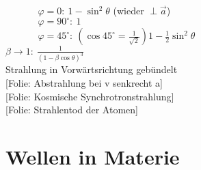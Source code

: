 \documentclass[titlepage,12pt,a4paper,ngerman]{report}
\newcommand{\folie}[1]{\color{gray}[Folie: #1]\color{black}}
\begin{document}
\begin{enumerate}[i)]
\begin{itemize}
		$\phantom{\qquad \quad \ \, }  \varphi = 0 :  \ 1 - \sin ^2 \theta  $ (wieder $ \perp \vec{a} $)\\
		$\phantom{\qquad \quad \ \, } \varphi = 90^\circ : \ 1 $\\
		$\phantom{\qquad \quad \ \, } \varphi = 45^\circ : \ (\cos 45^\circ = \frac{1}{\sqrt{2}} )  1 - \frac{1}{2} \sin^2 \theta $\\
		$ \beta \rightarrow 1 : \ \frac{1}{(1 - \beta \cos \theta)^3} $\\
		\phantom{\qquad \quad \ \, } Strahlung in Vorwärtsrichtung gebündelt\\
		\phantom{\qquad \quad \ \, } \folie{Abstrahlung bei v senkrecht a} \\ \phantom{\qquad \quad \ \, } \folie{Kosmische Synchrotronstrahlung} \\
		\phantom{\qquad \quad \ \, } \folie{Strahlentod der Atomen}
	\end{itemize}
\end{enumerate}

\section{Wellen in Materie}
\end{document}
